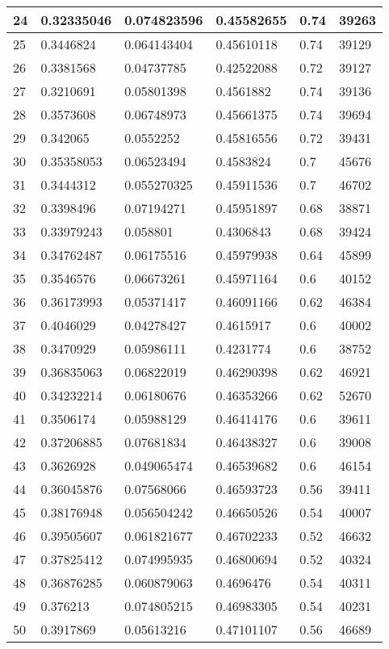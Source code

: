 \begin{longtable}{|l|l|l|l|l|l|}
24 & 0.32335046 & 0.074823596 & 0.45582655 & 0.74 & 39263 \\ \hline 
25 & 0.3446824 & 0.064143404 & 0.45610118 & 0.74 & 39129 \\ \hline 
26 & 0.3381568 & 0.04737785 & 0.42522088 & 0.72 & 39127 \\ \hline 
27 & 0.3210691 & 0.05801398 & 0.4561882 & 0.74 & 39136 \\ \hline 
28 & 0.3573608 & 0.06748973 & 0.45661375 & 0.74 & 39694 \\ \hline 
29 & 0.342065 & 0.0552252 & 0.45816556 & 0.72 & 39431 \\ \hline 
30 & 0.35358053 & 0.06523494 & 0.4583824 & 0.7 & 45676 \\ \hline 
31 & 0.3444312 & 0.055270325 & 0.45911536 & 0.7 & 46702 \\ \hline 
32 & 0.3398496 & 0.07194271 & 0.45951897 & 0.68 & 38871 \\ \hline 
33 & 0.33979243 & 0.058801 & 0.4306843 & 0.68 & 39424 \\ \hline 
34 & 0.34762487 & 0.06175516 & 0.45979938 & 0.64 & 45899 \\ \hline 
35 & 0.3546576 & 0.06673261 & 0.45971164 & 0.6 & 40152 \\ \hline 
36 & 0.36173993 & 0.05371417 & 0.46091166 & 0.62 & 46384 \\ \hline 
37 & 0.4046029 & 0.04278427 & 0.4615917 & 0.6 & 40002 \\ \hline 
38 & 0.3470929 & 0.05986111 & 0.4231774 & 0.6 & 38752 \\ \hline 
39 & 0.36835063 & 0.06822019 & 0.46290398 & 0.62 & 46921 \\ \hline 
40 & 0.34232214 & 0.06180676 & 0.46353266 & 0.62 & 52670 \\ \hline 
41 & 0.3506174 & 0.05988129 & 0.46414176 & 0.6 & 39611 \\ \hline 
42 & 0.37206885 & 0.07681834 & 0.46438327 & 0.6 & 39008 \\ \hline 
43 & 0.3626928 & 0.049065474 & 0.46539682 & 0.6 & 46154 \\ \hline 
44 & 0.36045876 & 0.07568066 & 0.46593723 & 0.56 & 39411 \\ \hline 
45 & 0.38176948 & 0.056504242 & 0.46650526 & 0.54 & 40007 \\ \hline 
46 & 0.39505607 & 0.061821677 & 0.46702233 & 0.52 & 46632 \\ \hline 
47 & 0.37825412 & 0.074995935 & 0.46800694 & 0.52 & 40324 \\ \hline 
48 & 0.36876285 & 0.060879063 & 0.4696476 & 0.54 & 40311 \\ \hline 
49 & 0.376213 & 0.074805215 & 0.46983305 & 0.54 & 40231 \\ \hline 
50 & 0.3917869 & 0.05613216 & 0.47101107 & 0.56 & 46689 \\ \hline 
\end{longtable}